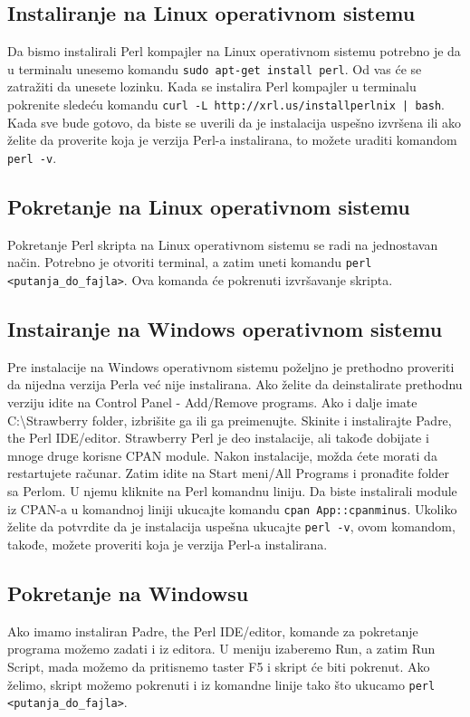 \documentclass[a4paper]{article}
\begin{document}
\subsection{Instaliranje na Linux operativnom sistemu}
Da bismo instalirali Perl kompajler na Linux operativnom sistemu potrebno je da u terminalu unesemo komandu {\lstinline!sudo apt-get install perl!}. Od vas će se zatražiti da unesete lozinku. Kada se instalira Perl kompajler u terminalu pokrenite sledeću komandu  {\lstinline !curl -L http://xrl.us/installperlnix | bash!}. Kada sve bude gotovo, da biste se uverili da je instalacija uspešno izvršena ili ako želite da proverite koja je verzija Perl-a instalirana, to možete uraditi komandom {\lstinline!perl -v!}.

\subsection{Pokretanje na Linux operativnom sistemu}
Pokretanje Perl skripta na Linux operativnom sistemu se radi na jednostavan način. Potrebno je otvoriti terminal, a zatim uneti komandu {\lstinline!perl <putanja_do_fajla>!}. Ova komanda će pokrenuti izvršavanje skripta.

\subsection{Instairanje na Windows operativnom sistemu}
Pre instalacije na Windows operativnom sistemu poželjno je  prethodno proveriti da nijedna verzija Perla već nije instalirana. Ako želite da deinstalirate prethodnu verziju idite na  Control Panel - Add/Remove programs. Ako i dalje imate C:\textbackslash Strawberry folder, izbrišite ga ili ga preimenujte. Skinite i instalirajte Padre, the Perl IDE/editor. Strawberry Perl je deo instalacije, ali takođe dobijate i mnoge druge korisne CPAN module. Nakon instalacije, možda ćete morati da restartujete računar. Zatim idite na Start meni/All Programs i pronađite folder sa Perlom. U njemu kliknite na Perl komandnu liniju.  Da biste instalirali module iz CPAN-a u komandnoj liniji ukucajte komandu {\lstinline!cpan App::cpanminus!}. Ukoliko želite da  potvrdite da je instalacija uspešna ukucajte {\lstinline!perl -v!}, ovom komandom, takođe, možete proveriti koja je verzija Perl-a instalirana.

\subsection{Pokretanje na Windowsu}
Ako imamo instaliran Padre, the Perl IDE/editor, komande za pokretanje programa možemo zadati i iz editora. U meniju izaberemo Run, a zatim Run Script, mada možemo da pritisnemo taster F5 i skript \'ce biti pokrenut.
Ako želimo, skript možemo pokrenuti i iz komandne linije tako što ukucamo {\lstinline!perl <putanja_do_fajla>!}.
\end{document}

